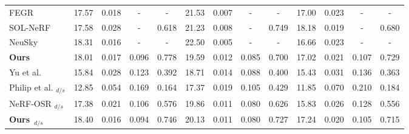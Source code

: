 \begin{table}[t]
{\begin{tabular}{lcccccccccccc}
      FEGR \cite{wang2023fegr}                      & 17.57                             & 0.018                             & -                                 & -               & 21.53           & 0.007            & -                & -               & 17.00           & 0.023            & -                & -               \\
      SOL-NeRF \cite{solnerf}                       & 17.58                             & 0.028                             & -                                 & 0.618           & 21.23           & 0.008            & -                & 0.749           & 18.18           & 0.019            & -                & 0.680           \\
      NeuSky \cite{gardner2023neusky}               & 18.31                             & 0.016                             & -                                 & -               & 22.50           & 0.005            & -                & -               & 16.66           & 0.023            & -                & -               \\
      \textbf{Ours}                                 & 18.01                             & 0.017                             & 0.096                             & 0.778           & 19.59           & 0.012            & 0.085            & 0.700           & 17.02           & 0.021            & 0.107            & 0.729           \\
      \midrule
      Yu et al. \cite{yu2020self}                   & 15.84                             & 0.028                             & 0.123                             & 0.392           & 18.71           & 0.014            & 0.088            & 0.400           & 15.43           & 0.031            & 0.136            & 0.363           \\
      Philip et al. $_{d/s}$ \cite{philip2019multi} & 12.85                             & 0.054                             & 0.169                             & 0.164           & 17.37           & 0.019            & 0.105            & 0.429           & 11.85           & 0.070            & 0.210            & 0.184           \\
      NeRF-OSR $_{d/s}$ \cite{rudnev2022nerfosr}    & 17.38                             & 0.021                             & 0.106                             & 0.576           & 19.86           & 0.011            & 0.080            & 0.626           & 15.83           & 0.026            & 0.128            & 0.556           \\
      \textbf{Ours}~$_{d/s}$                        & 18.40                             & 0.016                             & 0.094                             & 0.746           & 20.13           & 0.011            & 0.080            & 0.727           & 17.24           & 0.020            & 0.105            & 0.715           \\

\end{tabular}}
\end{table}
